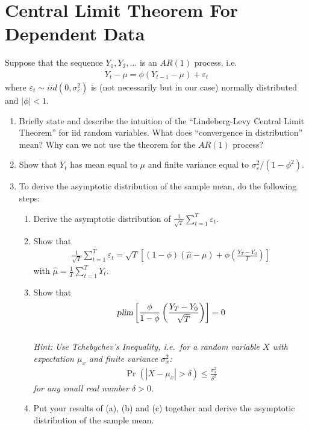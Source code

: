 \section[Central Limit Theorem For Dependent Data]{Central Limit Theorem For Dependent Data\label{ex:CentralLimitTheoremDependentData}}
Suppose that the sequence \(Y_{1},Y_{2},\ldots \) is an \(AR(1)\) process, i.e.
\begin{align*}
Y_{t}-\mu =\phi \left(Y_{t-1}-\mu\right) +\varepsilon _{t}
\end{align*}
where \(\varepsilon _{t}\sim iid(0,\sigma _{\varepsilon }^{2})\) is
  (not necessarily but in our case) normally distributed and \(|\phi |<1\).
\begin{enumerate}
\item Briefly state and describe the intuition of the \enquote{Lindeberg-Levy Central Limit Theorem} for iid random variables.
What does \enquote{convergence in distribution} mean?
Why can we not use the theorem for the \(AR(1)\) process?
\item Show that \(Y_t\) has mean equal to \(\mu \) and finite variance equal to \(\sigma_\varepsilon^2/(1-\phi^2)\).
\item To derive the asymptotic distribution of the sample mean, do the following steps:
\begin{enumerate}
	\item Derive the asymptotic distribution of \(\frac{1}{\sqrt{T} } \sum_{t=1}^T \varepsilon_t\).
	\item Show that
	\begin{align*}
		\frac{1}{\sqrt{T}} \sum_{t=1}^T \varepsilon_t = \sqrt{T}\left[(1-\phi)\left(\hat{\mu}-\mu\right) + \phi\left(\frac{Y_T - Y_0}{T}\right)\right]
	\end{align*}
	with \(\hat{\mu} =\frac{1}{T}\sum_{t=1}^{T}Y_{t}\).
	\item Show that
	\begin{align*}
	\textsl{plim}\left[\frac{\phi}{1-\phi}\left(\frac{Y_T - Y_0}{\sqrt{T}}\right)\right] = 0
	\end{align*}
	\\\emph{Hint: Use Tchebychev's Inequality,
	i.e.\ for a random variable \(X\) with expectation \(\mu_x\)
	and finite variance \(\sigma_x^2\):}
	\begin{align*}
	\Pr(|X-\mu_x|> \delta) \leq \frac{\sigma_x^2}{\delta^2}
	\end{align*}
	\emph{for any small real number \(\delta>0\).}
	\item Put your results of (a), (b) and (c) together and derive the asymptotic distribution of the sample mean.

\end{enumerate}
\end{enumerate}
